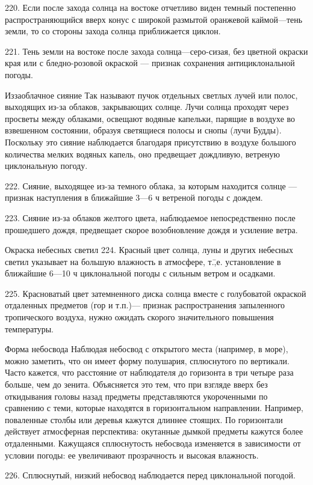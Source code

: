 220. Если после захода солнца на востоке отчетливо виден темный постепенно распространяющийся вверх конус с широкой размытой оранжевой каймой—тень земли, то со стороны захода солнца приближается циклон.

221. Тень земли на востоке после захода солнца—серо-сизая, без цветной окраски края или с бледно-розовой окраской — признак сохранения антициклональной погоды.

Иззаоблачное сияние
Так называют пучок отдельных светлых лучей или полос, выходящих из-за облаков, закрывающих солнце. Лучи солнца проходят через просветы между облаками, освещают водяные капельки, парящие в воздухе во взвешенном состоянии, образуя светящиеся полосы и снопы (лучи Будды). Поскольку это сияние наблюдается благодаря присутствию в воздухе большого количества мелких водяных капель, оно предвещает дождливую, ветреную циклональную погоду.

222. Сияние, выходящее из-за темного облака, за которым находится солнце — признак наступления в ближайшие 3—6 ч ветреной погоды с дождем.

223. Сияние из-за облаков желтого цвета, наблюдаемое непосредственно после прошедшего дождя, предвещает скорое возобновление дождя и усиление ветра.

Окраска небесных светил
224. Красный цвет солнца, луны и других небесных светил указывает на большую влажность в атмосфере, т.\=,е. установление в ближайшие 6—10 ч циклональной погоды с сильным ветром и осадками.

225. Красноватый цвет затемненного диска солнца вместе с голубоватой окраской отдаленных предметов (гор и т.п.)— признак распространения запыленного тропического воздуха, нужно ожидать скорого значительного повышения температуры.

Форма небосвода
Наблюдая небосвод с открытого места (например, в море), можно заметить, что он имеет форму полушария, сплюснутого по вертикали. Часто кажется, что расстояние от наблюдателя до горизонта в три четыре раза больше, чем до зенита. Объясняется это тем, что при взгляде вверх без откидывания головы назад предметы представляются укороченными по сравнению с теми, которые находятся в горизонтальном направлении.
Например, поваленные столбы или деревья кажутся длиннее стоящих. По горизонтали действует атмосферная перспектива: окутанные дымкой предметы кажутся более отдаленными. Кажущаяся сплюснутость небосвода изменяется в зависимости от условии погоды: ее увеличивают прозрачность и высокая влажность.

226. Сплюснутый, низкий небосвод наблюдается перед циклональной погодой.

